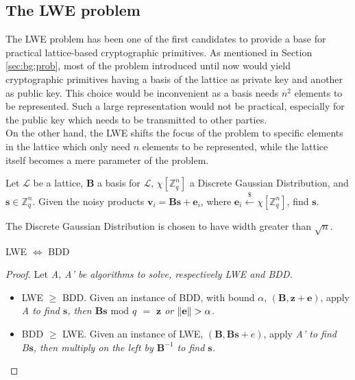 \subsection{The LWE problem}
The LWE problem has been one of the first candidates to provide a base for practical lattice-based cryptographic primitives. As mentioned in Section \ref{sec:bg:prob}, most of the problem introduced until now would yield cryptographic primitives having a basis of the lattice as private key and another as public key. This choice would be inconvenient as a basis needs $n^2$ elements to be represented. Such a large representation would not be practical, especially for the public key which needs to be transmitted to other parties.\\
On the other hand, the LWE shifts the focus of the problem to specific elements in the lattice which only need $n$ elements to be represented, while the lattice itself becomes a mere parameter of the problem.\\

\begin{definition}
Let $\mathscr{L}$ be a lattice, $\mathbf{B}$ a basis for $\mathscr{L}$, $\chi[\mathbb{Z}_q^n]$ a Discrete Gaussian Distribution, and $\mathbf{s}\in\mathbb{Z}_q^n$. Given the noisy products $\mathbf{v}_i=\mathbf{Bs} + \mathbf{e}_i$, where $\mathbf{e}_i\xleftarrow{\$}\chi[\mathbb{Z}_q^n]$, find $\mathbf{s}$.
\end{definition}

\begin{remark}
The Discrete Gaussian Distribution is chosen to have width greater than $\sqrt{n}$.
\end{remark}

\begin{theorem}
LWE $\Leftrightarrow$ BDD
\end{theorem}
\begin{proof}
Let \it{A}, \it{A'} be algorithms to solve, respectively LWE and BDD.
\begin{itemize}
\item LWE $\geq$ BDD. Given an instance of BDD, with bound $\alpha$, $(\mathbf{B},\mathbf{z}+\mathbf{e})$, apply \it{A} to find $\mathbf{s}$, then $\mathbf{Bs}$ $\mathrm{mod}$ $q$ $=$ $\mathbf{z}$ or $\left\lVert \mathbf{e} \right\rVert>\alpha$.
\item BDD $\geq$ LWE. Given an instance of LWE, $(\mathbf{B},\mathbf{Bs}+e)$, apply \it{A'} to find $B\mathbf{s}$, then multiply on the left by $\mathbf{B}^{-1}$ to find $\mathbf{s}$.
\end{itemize}
\end{proof}

